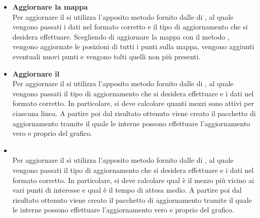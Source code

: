 \begin{itemize}
            \item \textbf{Aggiornare la mappa} \\
            Per aggiornare il  si utilizza l'apposito metodo fornito dalle  di , al quale vengono passati i dati nel formato corretto e il tipo di aggiornamento che si desidera effettuare. Scegliendo di aggiornare la mappa con il metodo , vengono aggiornate le posizioni di tutti i punti sulla mappa, vengono aggiunti eventuali nuovi punti e vengono tolti quelli non più presenti.
            
            \item \textbf{Aggiornare il } \\
            Per aggiornare il  si utilizza l'apposito metodo fornito dalle  di , al quale vengono passati il tipo di aggiornamento che si desidera effettuare e i dati nel formato corretto. In particolare, si deve calcolare quanti mezzi sono attivi per ciascuna linea. A partire poi dal risultato ottenuto viene creato il pacchetto di aggiornamento tramite il quale le  interne possono effettuare l'aggiornamento vero e proprio del grafico.
            
            \item {} \\
            Per aggiornare il  si utilizza l'apposito metodo fornito dalle  di , al quale vengono passati il tipo di aggiornamento che si desidera effettuare e i dati nel formato corretto. In particolare, si deve calcolare qual è il mezzo più vicino ai vari punti di interesse e qual è il tempo di attesa medio. A partire poi dal risultato ottenuto viene creato il pacchetto di aggiornamento tramite il quale le  interne possono effettuare l'aggiornamento vero e proprio del grafico.

        \end{itemize}

